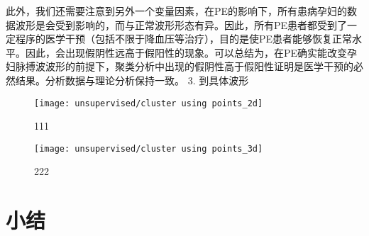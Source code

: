 此外，我们还需要注意到另外一个变量因素，在PE的影响下，所有患病孕妇的数据波形是会受到影响的，而与正常波形形态有异。因此，所有PE患者都受到了一定程序的医学干预（包括不限于降血压等治疗），目的是使PE患者能够恢复正常水平。因此，会出现假阴性远高于假阳性的现象。可以总结为，在PE确实能改变孕妇脉搏波波形的前提下，聚类分析中出现的假阴性高于假阳性证明是医学干预的必然结果。分析数据与理论分析保持一致。
3.	到具体波形

\begin{figure}[htbp]
    \centering
    \texttt{[image: unsupervised/cluster using points\_2d]}
    \caption[]{\label{fig:cluster2d}111}
\end{figure}
\begin{figure}[htbp]
    \centering
    \texttt{[image: unsupervised/cluster using points\_3d]}
    \caption[]{\label{fig:cluster3d}222}
\end{figure}
\section{小结}